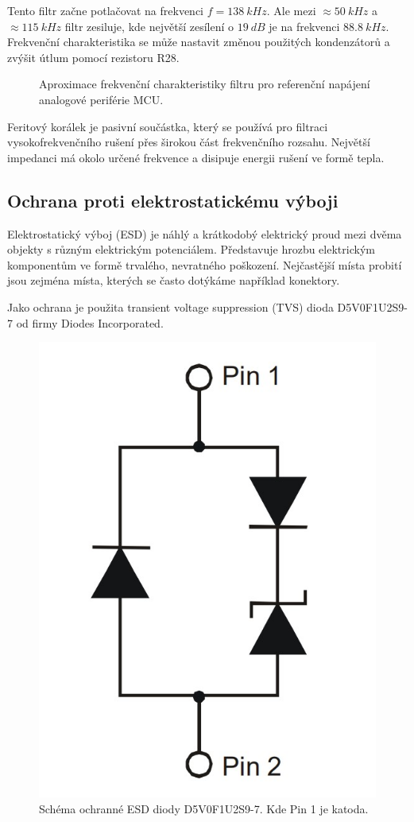Tento filtr začne potlačovat na frekvenci $f = 138 \ kHz$. Ale mezi $\approx 50 \ kHz$ a $ \approx 115 \ kHz$ filtr zesiluje, kde největší zesílení o $19 \ dB$ je na frekvenci $88.8 \ kHz$.
Frekvenční charakteristika se může nastavit změnou použitých kondenzátorů a zvýšit útlum pomocí rezistoru R28.

\begin{figure}[H]
    \caption{Aproximace frekvenční charakteristiky filtru pro referenční napájení analogové periférie MCU.}
    \label{fig:stm32_vref_response}
\end{figure}


Feritový korálek je pasivní součástka, který se používá pro filtraci vysokofrekvenčního rušení přes širokou část frekvenčního rozsahu. Největší impedanci má okolo určené frekvence a disipuje energii rušení ve formě tepla.
\subsection{Ochrana proti elektrostatickému výboji}
Elektrostatický výboj (ESD) je náhlý a krátkodobý elektrický proud mezi dvěma objekty s různým elektrickým potenciálem. Představuje hrozbu elektrickým komponentům ve formě trvalého, nevratného poškození. Nejčastější místa probití jsou zejména místa, kterých se často dotýkáme například konektory.
\par
Jako ochrana je použita transient voltage suppression (TVS) dioda D5V0F1U2S9-7 od firmy Diodes Incorporated.

\begin{figure}[H]
    \centering
    \includegraphics[width=0.4\linewidth]{pictures/esd_diode_schema.jpg}
    \caption{Schéma ochranné ESD diody D5V0F1U2S9-7. Kde Pin 1 je katoda. \cite{cite:ESD}}
    \label{fig:esd_diode}
\end{figure}

